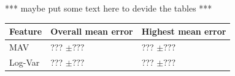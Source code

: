 \documentclass[landscape,a0paper,fontscale=0.37]{baposter} %
\begin{document}
\begin{poster}
{*** maybe put some text here to devide the tables ***

\begin{center}
\begin{tabular}{l l l}
\toprule
\textbf{Feature} & \textbf{Overall mean error} & \textbf{Highest mean error}\\
\midrule
MAV & ??? $\pm ???$ & ??? $\pm ???$ \\
Log-Var & ??? $\pm ???$ & ??? $\pm ???$ \\
\bottomrule
\end{tabular}
\end{center}
}


\end{poster}
\end{document}
